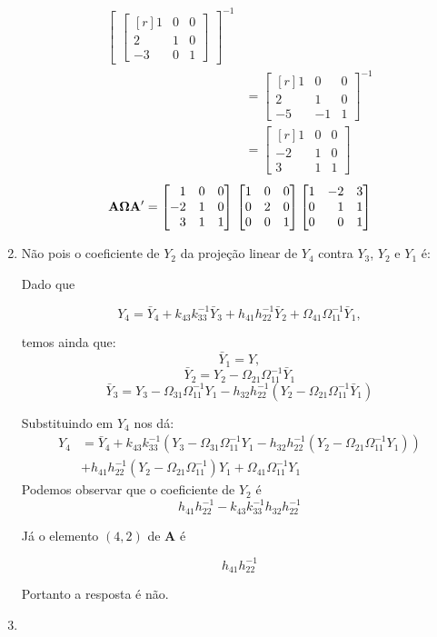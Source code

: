 \begin{enumerate}
\begin{align*}
\begin{bmatrix}
\begin{bmatrix*}[r]
1&0&0\\
2&1&0\\
-3&0&1
\end{bmatrix*}\end{bmatrix}^{-1}\\
&=\begin{bmatrix*}[r]
1&0&0\\
2&1&0\\
-5&-1&1
\end{bmatrix*}^{-1}\\
&=\begin{bmatrix*}[r]
	1&0&0\\
	-2&1&0\\
	3&1&1
\end{bmatrix*}
\end{align*}
$$\mathbf{A}\boldsymbol{\Omega}\mathbf{A}'=\begin{bmatrix*}[r]
1&0&0\\
-2&1&0\\
3&1&1
\end{bmatrix*}\\
\begin{bmatrix*}[r]
1&0&0\\
0&2&0\\
0&0&1
\end{bmatrix*}
\begin{bmatrix*}[r]
1&-2&3\\
0&1&1\\
0&0&1
\end{bmatrix*}$$


	 

	
	\item[\fbox{4.4}]
	
	Não pois o coeficiente de $Y_2$ da projeção linear de $Y_4$ contra $Y_3$, $Y_2$ e $Y_1$ é:
	
	Dado que
	
	$$Y_4=\bar{Y}_4+k_{43}k_{33}^{-1}\bar{Y}_3+h_{41}h_{22}^{-1}\bar{Y}_2+\Omega_{41}\Omega_{11}^{-1}\bar{Y}_1,$$
	
	temos ainda que:
	  $$\bar{Y}_1=Y,$$
	 $$\bar{Y}_2=Y_2-\Omega_{21}\Omega_{11}^{-1}\bar{Y}_1$$
	 $$\bar{Y}_3=Y_3-\Omega_{31}\Omega_{11}^{-1}Y_1-h_{32}h_{22}^{-1}(Y_2-\Omega_{21}\Omega_{11}^{-1}\bar{Y}_1)$$
	 
	 Substituindo em $Y_4$ nos dá:
	 	\begin{align*}
	 	Y_4&=\bar{Y}_4+k_{43}k_{33}^{-1}(Y_3-\Omega_{31}\Omega_{11}^{-1}Y_1-h_{32}h_{22}^{-1}(Y_2-\Omega_{21}\Omega_{11}^{-1}{Y}_1))\\
	 	&+h_{41}h_{22}^{-1}(Y_2-\Omega_{21}\Omega_{11}^{-1}){Y}_1+\Omega_{41}\Omega_{11}^{-1}{Y}_1
	 	\end{align*}
	 Podemos observar que o coeficiente de $Y_2$ é 
	 $$h_{41}h_{22}^{-1}-k_{43}k_{33}^{-1}h_{32}h_{22}^{-1}$$
	 
	 Já o elemento $(4,2)$ de $\mathbf{A}$ é 
	 
	 $$h_{41}h_{22}^{-1}$$
	 
	 Portanto a resposta é não.
	 
	 \item[\fbox{4.5}]
	 
	 
	 
\end{enumerate}